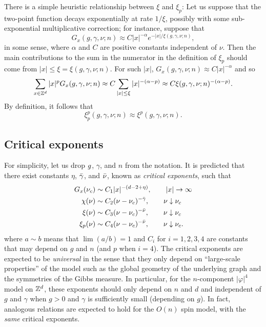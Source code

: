 \begin{rk}
There is a simple heuristic relationship between $\xi$ and $\xi_p$: Let us suppose that
the two-point function decays exponentially at rate $1/\xi$, possibly with some
sub-exponential multiplicative correction; for instance, suppose that
\begin{equation}
G_x(g, \gamma, \nu; n) \approx C |x|^{-\alpha} e^{-|x|/\xi(g, \gamma, \nu; n)},
\end{equation}
in some sense, where $\alpha$ and $C$ are positive constants independent of $\nu$.
Then the main contributions to the sum in the numerator in the definition of
$\xi_p$ should come from $|x| \le \xi = \xi(g, \gamma, \nu; n)$. For such $|x|$,
$G_x(g, \gamma, \nu; n) \approx C |x|^{-\alpha}$ and so
\begin{equation}
\sum_{x\in{ {{\mathbb Z}}^d }} |x|^p G_x(g, \gamma, \nu; n)
	\approx
C \sum_{|x| \le \xi} |x|^{-(\alpha-p)}
	\approx
C \xi(g, \gamma, \nu; n)^{-(\alpha-p)}.
\end{equation}
By definition, it follows that
\begin{equation}
\xi^p_p(g, \gamma, \nu; n) \approx \xi^p(g, \gamma, \nu; n).
\end{equation}
\end{rk}

\subsection{Critical exponents}

For simplicity, let us drop $g$, $\gamma$, and $n$ from the notation.
It is predicted that there exist constants $\eta$, $\bar\gamma$, and $\bar\nu$,
known as \emph{critical exponents}, such that
\begin{align}
G_x(\nu_c)
	&\sim
C_1 |x|^{-(d - 2 + \eta)},
	\qquad
|x|\rightarrow\infty \\
\chi(\nu)
	&\sim
C_2 (\nu - \nu_c)^{-\bar\gamma},
	\qquad
\nu\downarrow\nu_c \\
\xi(\nu)
	&\sim
C_3 (\nu - \nu_c)^{-\bar\nu},
	\qquad
\nu\downarrow\nu_c \\
\xi_p(\nu)
	&\sim
C_4 (\nu - \nu_c)^{-\bar\nu},
	\qquad
\nu\downarrow\nu_c.
\end{align}
where $a \sim b$ means that $\lim (a/b) = 1$ and $C_i$ for $i = 1,2,3,4$
are constants that may depend on $g$ and $n$ (and $p$ when $i = 4$).
The critical exponents are expected to be \emph{universal} in the sense that they
only depend on ``large-scale properties'' of the model such as the global geometry
of the underlying graph and the symmetries of the Gibbs measure. In particular,
for the $n$-component $|\varphi|^4$ model on ${ {{\mathbb Z}}^d }$, these exponents should only
depend on $n$ and $d$ and independent of $g$ and $\gamma$ when $g > 0$ and $\gamma$
is sufficiently small (depending on $g$). In fact,
analogous relations are expected to hold for the $O(n)$ spin model, with the
\emph{same} critical exponents.


